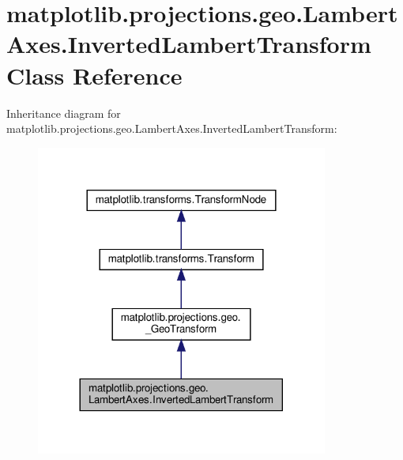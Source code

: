 \hypertarget{classmatplotlib_1_1projections_1_1geo_1_1LambertAxes_1_1InvertedLambertTransform}{}\section{matplotlib.\+projections.\+geo.\+Lambert\+Axes.\+Inverted\+Lambert\+Transform Class Reference}
\label{classmatplotlib_1_1projections_1_1geo_1_1LambertAxes_1_1InvertedLambertTransform}


Inheritance diagram for matplotlib.\+projections.\+geo.\+Lambert\+Axes.\+Inverted\+Lambert\+Transform\+:
\nopagebreak
\begin{figure}[H]
\begin{center}
\leavevmode
\includegraphics[width=272pt]{classmatplotlib_1_1projections_1_1geo_1_1LambertAxes_1_1InvertedLambertTransform__inherit__graph}
\end{center}
\end{figure}


